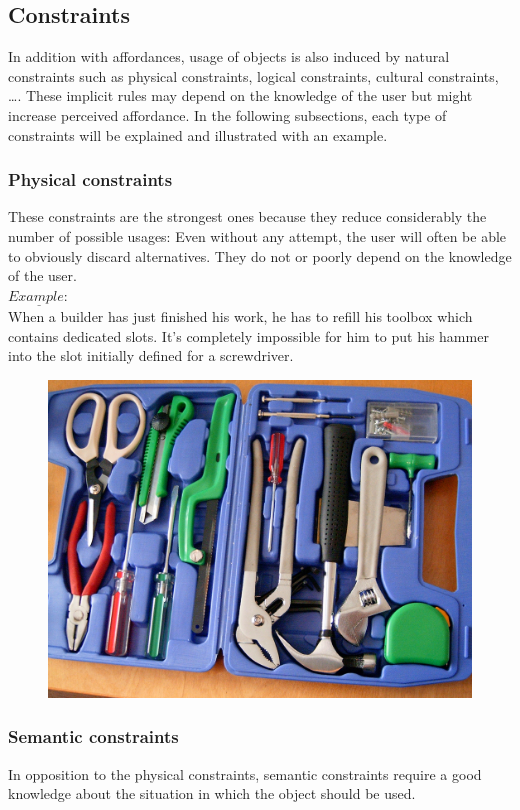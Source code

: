 \documentclass[a4paper,11pt] {article}
\theoremstyle{definition}
\begin{document}
    \subsection{Constraints}
	In addition with affordances, usage of objects is also induced by natural constraints such as physical constraints, logical constraints, cultural constraints, \ldots. These implicit rules may depend on the knowledge of the user but might increase perceived affordance. In the following subsections, each type of constraints will be explained and illustrated with an example.
        \subsubsection{Physical constraints}
        These constraints are the strongest ones because they reduce considerably the number of possible 	usages: Even without any attempt, the user will often be able to obviously discard  alternatives. They do not or poorly depend on the knowledge of the user.\\

        $\underline{Example:}$\\
        When a builder has just finished his work, he has to refill his toolbox which contains dedicated 		slots. It's completely impossible for him to put his hammer into the slot initially defined for a screwdriver.
        \begin{figure}[h]
        \centering
        \includegraphics[scale=0.1]{fig-report/toolbox.jpg}
        \end{figure}
        \subsubsection{Semantic constraints}
       In opposition to the physical constraints, semantic constraints require a good knowledge about the situation in which the object should be used.\\
\end{document}
